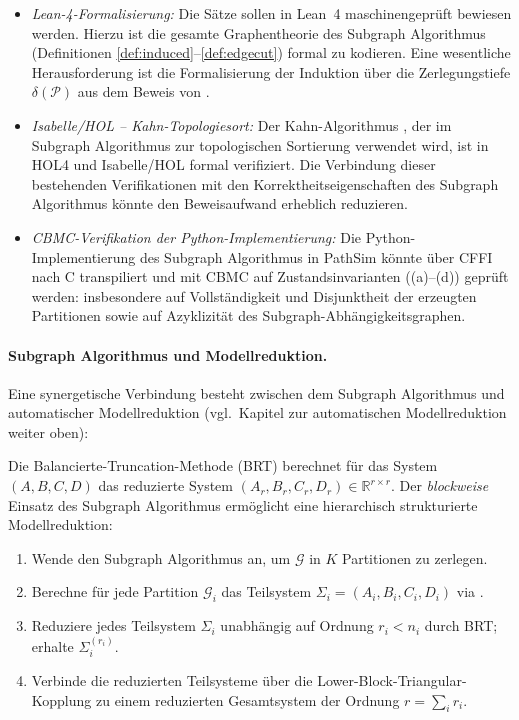 ﻿\documentclass[12pt,a4paper]{article}
\theoremstyle{definition}
\begin{document}
\begin{itemize}[nosep]
  \item \emph{Lean-4-Formalisierung:} Die Sätze
        sollen in Lean~4 maschinengeprüft bewiesen werden. Hierzu
        ist die gesamte Graphentheorie des Subgraph Algorithmus
        (Definitionen \ref{def:induced}--\ref{def:edgecut}) formal
        zu kodieren. Eine wesentliche Herausforderung ist die
        Formalisierung der Induktion über die Zerlegungstiefe
        $\delta(\mathcal{P})$ aus dem Beweis von .

  \item \emph{Isabelle/HOL -- Kahn-Topologiesort:} Der Kahn-Algorithmus
        \cite{kahn1962}, der im Subgraph Algorithmus zur topologischen
        Sortierung verwendet wird, ist in HOL4 und Isabelle/HOL
        formal verifiziert. Die Verbindung dieser bestehenden
        Verifikationen mit den Korrektheitseigenschaften des Subgraph
        Algorithmus könnte den Beweisaufwand erheblich reduzieren.

  \item \emph{CBMC-Verifikation der Python-Implementierung:} Die
        Python-Implementierung des Subgraph Algorithmus in PathSim
        könnte über CFFI nach C transpiliert und mit CBMC auf
        Zustandsinvarianten ((a)--(d)) geprüft
        werden: insbesondere auf Vollständigkeit und Disjunktheit
        der erzeugten Partitionen sowie auf Azyklizität des
        Subgraph-Abhängigkeitsgraphen.
\end{itemize}

\paragraph{Subgraph Algorithmus und Modellreduktion.}
Eine synergetische Verbindung besteht zwischen dem Subgraph Algorithmus
und automatischer Modellreduktion
(vgl.\ Kapitel zur automatischen Modellreduktion weiter oben):

Die Balancierte-Truncation-Methode (BRT) berechnet für das
System $(A, B, C, D)$ das reduzierte System
$(A_r, B_r, C_r, D_r) \in \mathbb{R}^{r \times r}$.
Der \emph{blockweise} Einsatz des Subgraph Algorithmus ermöglicht
eine hierarchisch strukturierte Modellreduktion:

\begin{enumerate}[label=(\roman*), nosep]
  \item Wende den Subgraph Algorithmus an, um $\mathcal{G}$ in $K$
        Partitionen zu zerlegen.
  \item Berechne für jede Partition $\mathcal{G}_i$ das Teilsystem
        $\Sigma_i = (A_i, B_i, C_i, D_i)$ via .
  \item Reduziere jedes Teilsystem $\Sigma_i$ unabhängig auf
        Ordnung $r_i < n_i$ durch BRT; erhalte $\Sigma_i^{(r_i)}$.
  \item Verbinde die reduzierten Teilsysteme über die
        Lower-Block-Triangular-Kopplung zu einem reduzierten
        Gesamtsystem der Ordnung $r = \sum_i r_i$.
\end{enumerate}
\end{document}
